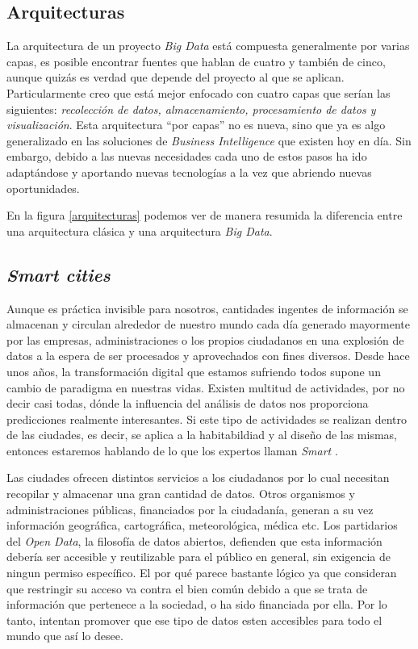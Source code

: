 \subsection{Arquitecturas}

La arquitectura de un proyecto \emph{Big Data} está compuesta generalmente por varias capas, es posible encontrar fuentes que hablan de cuatro y también de cinco, aunque quizás es verdad que depende del proyecto al que se aplican. Particularmente creo que está mejor enfocado con cuatro capas que serían las siguientes: \emph{recolección de datos, almacenamiento, procesamiento de datos y visualización}. Esta arquitectura “por capas” no es nueva, sino que ya es algo generalizado en las soluciones de \textit{Business Intelligence} que existen hoy en día. Sin embargo, debido a las nuevas necesidades cada uno de estos pasos ha ido adaptándose y aportando nuevas tecnologías a la vez que abriendo nuevas oportunidades. 

En la figura \ref{arquitecturas} podemos ver de manera resumida la diferencia entre una arquitectura clásica y una arquitectura\textit{ Big Data}.


\subsection{\emph{Smart cities}}

Aunque es práctica invisible para nosotros, cantidades ingentes de información se almacenan y circulan alrededor de nuestro mundo cada día generado mayormente por las empresas, administraciones o los propios ciudadanos en una explosión de datos a la espera de ser procesados y aprovechados con fines diversos. Desde hace unos años, la transformación digital que estamos sufriendo todos supone un cambio de paradigma en nuestras vidas. Existen multitud de actividades, por no decir casi todas, dónde la influencia del análisis de datos nos proporciona predicciones realmente interesantes. Si este tipo de actividades se realizan dentro de las ciudades, es decir, se aplica a la habitabildiad y al diseño de las mismas, entonces estaremos hablando de lo que los expertos llaman \emph{Smart} \cite{foote_big_2018}.

Las ciudades ofrecen distintos servicios a los ciudadanos por lo cual necesitan recopilar y almacenar una gran cantidad de datos. Otros organismos y administraciones públicas, financiados por la ciudadanía, generan a su vez información geográfica, cartográfica, meteorológica, médica etc. Los partidarios del \emph{Open Data}, la filosofía de datos abiertos, defienden que esta información debería ser accesible y reutilizable para el público en general, sin exigencia de ningun permiso específico. El por qué parece bastante lógico ya que consideran que restringir su acceso va contra el bien común debido a que se trata de información que pertenece a la sociedad, o ha sido financiada por ella. Por lo tanto, intentan promover que ese tipo de datos esten accesibles para todo el mundo que así lo desee. 

